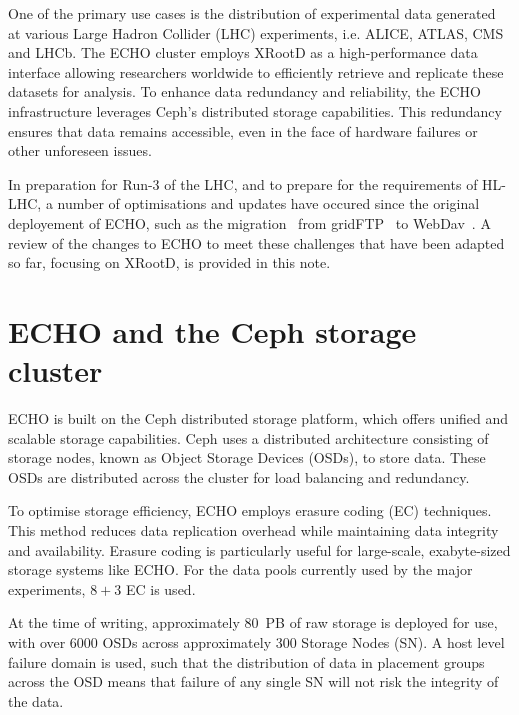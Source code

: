 \documentclass{webofc}
\begin{document}
One of the primary use cases is the distribution of experimental data generated at various Large Hadron Collider (LHC) experiments, i.e. ALICE, ATLAS, CMS and LHCb. The ECHO cluster employs XRootD as a high-performance data interface allowing researchers worldwide to efficiently retrieve and replicate these datasets for analysis.
To enhance data redundancy and reliability, the ECHO infrastructure leverages Ceph's distributed storage capabilities. This redundancy ensures that data remains accessible, even in the face of hardware failures or other unforeseen issues. 

In preparation for Run-3 of the LHC, and to prepare for the requirements of HL-LHC, a number of optimisations and updates have occured since the original deployement of ECHO, such as the migration~\cite{Bockelman_2020} from gridFTP~\cite{allcock2001gridftp} to WebDav~\cite{webdav}. 
A review of the changes to ECHO to meet these challenges that have been adapted so far, focusing on XRootD, is provided in this note. 

\section{ECHO and the Ceph storage cluster\label{ceph}}
ECHO is built on the Ceph distributed storage platform, which offers unified and scalable storage capabilities. Ceph uses a distributed architecture consisting of storage nodes, known as Object Storage Devices (OSDs), to store data. These OSDs are distributed across the cluster for load balancing and redundancy. 

To optimise storage efficiency, ECHO employs erasure coding (EC) techniques. This method reduces data replication overhead while maintaining data integrity and availability. Erasure coding is particularly useful for large-scale, exabyte-sized storage systems like ECHO. For the data pools currently used by the major experiments, $8+3$ EC is used. 

At the time of writing, approximately $80$~PB of raw storage is deployed for use, with over 6000 OSDs across approximately 300 Storage Nodes (SN). 
A host level failure domain is used, such that the distribution of data in placement groups across the OSD means that failure of any single SN will not risk the integrity of the data. 
\end{document}
